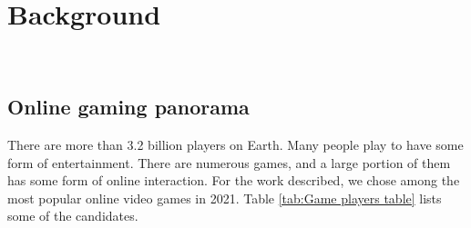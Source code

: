 
\chapter{Background}
\label{cap:descrizione-stage}

\\

\section{\label{sec:ogp}Online gaming panorama}

	There are more than 3.2 billion players on Earth\cite{site:statista}. 
	Many people play to have some form of entertainment. 
	There are numerous games, and a large portion of them has some form of online interaction. 
	For the work described, we chose among the most popular online video games in 2021. 
	Table \ref{tab:Game players table} lists some of the candidates. 	
	
